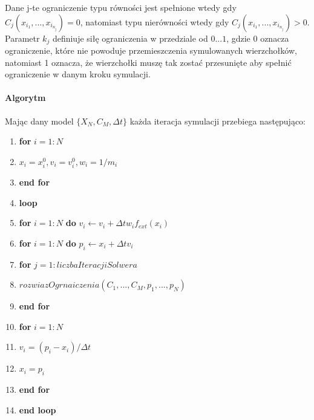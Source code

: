\raggedright
Dane j-te ograniczenie typu równości jest spełnione wtedy gdy $C_j(x_{i_1},...,
		x_{i_{n_j}}) = 0$, natomiast typu nierówności wtedy gdy $C_j(x_{i_1},...,
		x_{i_{n_j}}) > 0$. Parametr $k_j$ definiuje siłę ograniczenia w
		przedziale od $0...1$, gdzie 0 oznacza ograniczenie, które nie powoduje
		przemieszczenia symulowanych wierzchołków, natomiast 1 oznacza, że
		wierzchołki muszę tak zostać przesunięte aby spełnić ograniczenie w
		danym kroku symulacji.

\paragraph{Algorytm}

Mając dany model $\{X_N, C_M, \Delta t \} $ każda iteracja symulacji przebiega
następująco:
\begin{enumerate}
\item \textbf{for} $i = 1:N$
\item \hspace{1cm} $x_i = x_i^0, v_i = v_i^0, w_i = 1/m_i$
\item \textbf{end for}
\item \textbf{loop}
\item \hspace{1cm} \textbf{for} $i = 1:N$ \textbf{do} $v_i \leftarrow v_i + \Delta t w_i f_{ext}(x_i)$
\item \hspace{1cm} \textbf{for} $i = 1:N$ \textbf{do} $p_i \leftarrow x_i + \Delta t v_i$
\item \hspace{1cm} \textbf{for} $j = 1:liczbaIteracjiSolwera$
\item \hspace{2cm} $rozwiazOgrnaiczenia(C_1,..., C_{M}, p_1, ..., p_N)$
\item \hspace{1cm} \textbf{end for}
\item \hspace{1cm} \textbf{for} $i = 1:N$
\item \hspace{2cm} $v_i = (p_i - x_i) / \Delta t$
\item \hspace{2cm} $x_i = p_i$
\item \hspace{1cm}\textbf{end for}
\item \textbf{end loop}

\end{enumerate}

